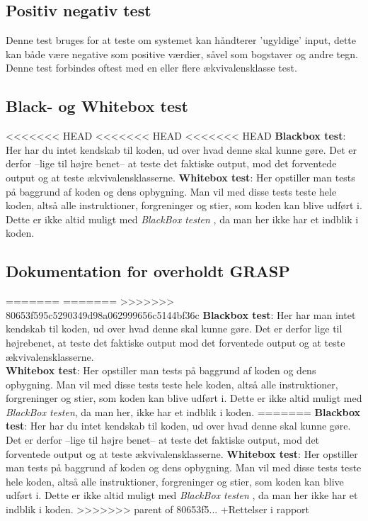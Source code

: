     \subsection{Positiv negativ test}
        Denne test bruges for at teste om systemet kan håndterer 'ugyldige' input, dette kan både være negative som positive værdier, såvel som bogstaver og andre tegn. Denne test forbindes oftest med en eller flere ækvivalensklasse test.
    \subsection{Black- og Whitebox test}
<<<<<<< HEAD
<<<<<<< HEAD
<<<<<<< HEAD
        \textbf{Blackbox test}: Her har du intet kendskab til koden, ud over hvad denne skal kunne gøre. Det er derfor --lige til højre benet-- at teste det faktiske output, mod det forventede output og at teste ækvivalensklasserne.
        \textbf{Whitebox test}: Her opstiller man tests på baggrund af koden og dens opbygning. Man vil med disse tests teste hele koden, altså alle instruktioner, forgreninger og stier, som koden kan blive udført i. Dette er ikke altid muligt med \textit{BlackBox testen} , da man her ikke har et indblik i koden.

\subsection{Dokumentation for overholdt GRASP}
=======
=======
>>>>>>> 80653f595c5290349d98a062999656c5144bf36c
        \textbf{Blackbox test}: Her har man intet kendskab til koden, ud over hvad denne skal kunne gøre. Det er derfor lige til højrebenet, at teste det faktiske output mod det forventede output og at teste ækvivalensklasserne.
        \\
        \textbf{Whitebox test}: Her opstiller man tests på baggrund af koden og dens opbygning. Man vil med disse tests teste hele koden, altså alle instruktioner, forgreninger og stier, som koden kan blive udført i. Dette er ikke altid muligt med \textit{BlackBox testen}, da man her, ikke har et indblik i koden.
=======
        \textbf{Blackbox test}: Her har du intet kendskab til koden, ud over hvad denne skal kunne gøre. Det er derfor --lige til højre benet-- at teste det faktiske output, mod det forventede output og at teste ækvivalensklasserne.
        \textbf{Whitebox test}: Her opstiller man tests på baggrund af koden og dens opbygning. Man vil med disse tests teste hele koden, altså alle instruktioner, forgreninger og stier, som koden kan blive udført i. Dette er ikke altid muligt med \textit{BlackBox testen} , da man her ikke har et indblik i koden.
>>>>>>> parent of 80653f5... +Rettelser i rapport

